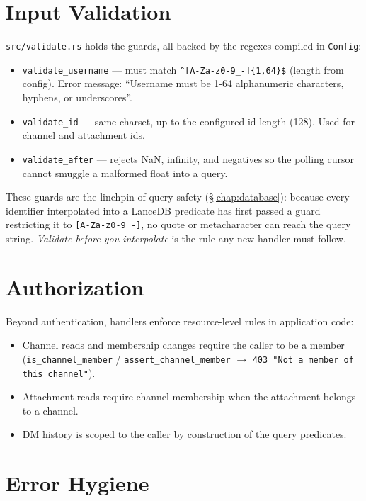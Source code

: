 \section{Input Validation}

\verb|src/validate.rs| holds the guards, all backed by the regexes compiled in
\verb|Config|:

\begin{itemize}
  \item \verb|validate_username| --- must match
        \verb|^[A-Za-z0-9_-]{1,64}$| (length from config). Error message:
        ``Username must be 1-64 alphanumeric characters, hyphens, or
        underscores''.
  \item \verb|validate_id| --- same charset, up to the configured id length
        (128). Used for channel and attachment ids.
  \item \verb|validate_after| --- rejects NaN, infinity, and negatives so the
        polling cursor cannot smuggle a malformed float into a query.
\end{itemize}

These guards are the linchpin of query safety (\S\ref{chap:database}): because
every identifier interpolated into a LanceDB predicate has first passed a
guard restricting it to \verb|[A-Za-z0-9_-]|, no quote or metacharacter can reach
the query string. \emph{Validate before you interpolate} is the rule any new
handler must follow.

\section{Authorization}

Beyond authentication, handlers enforce resource-level rules in application code:

\begin{itemize}
  \item Channel reads and membership changes require the caller to be a member
        (\verb|is_channel_member| / \verb|assert_channel_member| $\to$
        \verb|403 "Not a member of this channel"|).
  \item Attachment reads require channel membership when the attachment belongs
        to a channel.
  \item DM history is scoped to the caller by construction of the query
        predicates.
\end{itemize}

\section{Error Hygiene}

